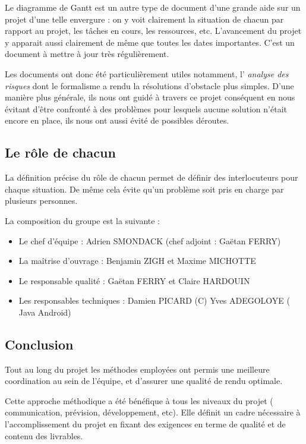   Le diagramme de Gantt est un autre type de document d'une grande aide sur un
  projet d'une telle envergure : on y voit clairement la situation de chacun
  par rapport au projet, les tâches en cours, les ressources, etc.
  L'avancement du projet y apparait aussi clairement de même que toutes les
  dates importantes. C'est un document à mettre à jour très régulièrement.

  Les documents ont donc été particulièrement utiles notamment, l'\emph{
  analyse des risques} dont le formalisme a rendu la résolutions d'obstacle
  plus simples. D'une manière plus générale, ils nous ont guidé à travers ce
  projet conséquent en nous évitant d'être confronté à des problèmes pour
  lesquels aucune solution n'était encore en place, ils nous ont aussi évité
  de possibles déroutes.

\subsection{Le rôle de chacun}

  La définition précise du rôle de chacun permet de définir des interlocuteurs
  pour chaque situation. De même cela évite qu'un problème soit pris en charge
  par plusieurs personnes.

  La composition du groupe est la suivante :
  \begin{itemize}
    \item Le chef d'équipe : Adrien SMONDACK (chef adjoint : Gaëtan FERRY)
    \item La maîtrise d'ouvrage : Benjamin ZIGH et Maxime MICHOTTE
    \item Le responsable qualité : Gaëtan FERRY et Claire HARDOUIN
    \item Les responsables techniques : Damien PICARD (C) Yves ADEGOLOYE (
    Java Android)
  \end{itemize}


\subsection{Conclusion}

  Tout au long du projet les méthodes employées ont permis une meilleure
  coordination au sein de l'équipe, et d'assurer une qualité de rendu optimale.

  Cette approche méthodique a été bénéfique à tous les niveaux du projet (
  communication, prévision, développement, etc). Elle définit un cadre
  nécessaire à l'accomplissement du projet en fixant des exigences en terme de
  qualité et de contenu des livrables.


